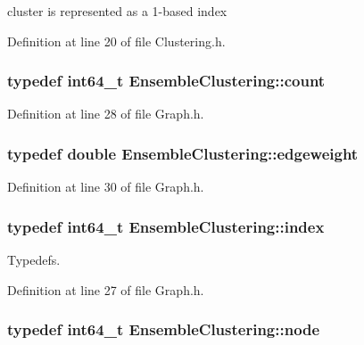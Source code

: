 cluster is represented as a 1-\/based index 



Definition at line 20 of file Clustering.\-h.

\hypertarget{namespace_ensemble_clustering_a2482e94ca22a0c6544a5a9173186fde8}{
\subsubsection[{count}]{\setlength{\rightskip}{0pt plus 5cm}typedef int64\-\_\-t {\bf Ensemble\-Clustering\-::count}}}\label{namespace_ensemble_clustering_a2482e94ca22a0c6544a5a9173186fde8}


Definition at line 28 of file Graph.\-h.

\hypertarget{namespace_ensemble_clustering_ab3fbffa545e4c22660e80229ca1a7d4a}{
\subsubsection[{edgeweight}]{\setlength{\rightskip}{0pt plus 5cm}typedef double {\bf Ensemble\-Clustering\-::edgeweight}}}\label{namespace_ensemble_clustering_ab3fbffa545e4c22660e80229ca1a7d4a}


Definition at line 30 of file Graph.\-h.

\hypertarget{namespace_ensemble_clustering_a1ba11e6d628873b803a26fe054f45e28}{
\subsubsection[{index}]{\setlength{\rightskip}{0pt plus 5cm}typedef int64\-\_\-t {\bf Ensemble\-Clustering\-::index}}}\label{namespace_ensemble_clustering_a1ba11e6d628873b803a26fe054f45e28}


Typedefs. 



Definition at line 27 of file Graph.\-h.

\hypertarget{namespace_ensemble_clustering_ae829290aeccd1a420b17a37fd901f114}{
\subsubsection[{node}]{\setlength{\rightskip}{0pt plus 5cm}typedef int64\-\_\-t {\bf Ensemble\-Clustering\-::node}}}\label{namespace_ensemble_clustering_ae829290aeccd1a420b17a37fd901f114}


